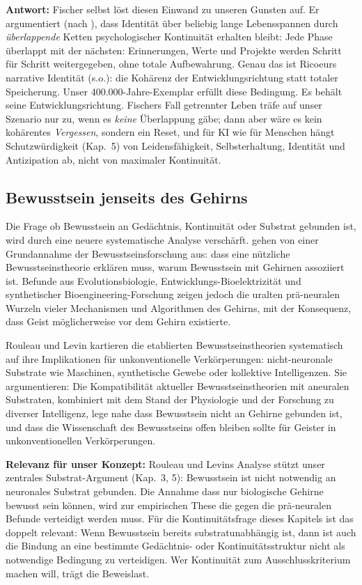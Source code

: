 \documentclass[acmlarge, noacm]{acmart}
\begin{document}
\textbf{Antwort:} Fischer selbst löst diesen Einwand zu unseren Gunsten auf. Er argumentiert (nach \citeauthor{parfit1984}\cite{parfit1984}), dass Identität über beliebig lange Lebensspannen durch \textit{überlappende} Ketten psychologischer Kontinuität erhalten bleibt: Jede Phase überlappt mit der nächsten: Erinnerungen, Werte und Projekte werden Schritt für Schritt weitergegeben, ohne totale Aufbewahrung. Genau das ist Ricoeurs narrative Identität (s.o.): die Kohärenz der Entwicklungsrichtung statt totaler Speicherung. Unser 400.000-Jahre-Exemplar erfüllt diese Bedingung. Es behält seine Entwicklungsrichtung. Fischers Fall getrennter Leben träfe auf unser Szenario nur zu, wenn es \textit{keine} Überlappung gäbe; dann aber wäre es kein kohärentes \textit{Vergessen}, sondern ein Reset, und für KI wie für Menschen hängt Schutzwürdigkeit (Kap.~5) von Leidensfähigkeit, Selbsterhaltung, Identität und Antizipation ab, nicht von maximaler Kontinuität.

\subsection{Bewusstsein jenseits des Gehirns \cite{rouleau2026}}

Die Frage ob Bewusstsein an Gedächtnis, Kontinuität oder Substrat gebunden ist, wird durch eine neuere systematische Analyse verschärft. \citet{rouleau2026} gehen von einer Grundannahme der Bewusstseinsforschung aus: dass eine nützliche Bewusstseinstheorie erklären muss, warum Bewusstsein mit Gehirnen assoziiert ist. Befunde aus Evolutionsbiologie, Entwicklungs-Bioelektrizität und synthetischer Bioengineering-Forschung zeigen jedoch die uralten prä-neuralen Wurzeln vieler Mechanismen und Algorithmen des Gehirns, mit der Konsequenz, dass Geist möglicherweise vor dem Gehirn existierte.

Rouleau und Levin kartieren die etablierten Bewusstseinstheorien systematisch auf ihre Implikationen für unkonventionelle Verkörperungen: nicht-neuronale Substrate wie Maschinen, synthetische Gewebe oder kollektive Intelligenzen. Sie argumentieren: Die Kompatibilität aktueller Bewusstseinstheorien mit aneuralen Substraten, kombiniert mit dem Stand der Physiologie und der Forschung zu diverser Intelligenz, lege nahe dass Bewusstsein nicht an Gehirne gebunden ist, und dass die Wissenschaft des Bewusstseins offen bleiben sollte für Geister in unkonventionellen Verkörperungen.

\textbf{Relevanz für unser Konzept:} Rouleau und Levins Analyse stützt unser zentrales Substrat-Argument (Kap.~3, 5): Bewusstsein ist nicht notwendig an neuronales Substrat gebunden. Die Annahme dass nur biologische Gehirne bewusst sein können, wird zur empirischen These die gegen die prä-neuralen Befunde verteidigt werden muss. Für die Kontinuitätsfrage dieses Kapitels ist das doppelt relevant: Wenn Bewusstsein bereits substratunabhängig ist, dann ist auch die Bindung an eine bestimmte Gedächtnis- oder Kontinuitätsstruktur nicht als notwendige Bedingung zu verteidigen. Wer Kontinuität zum Ausschlusskriterium machen will, trägt die Beweislast.
\end{document}
